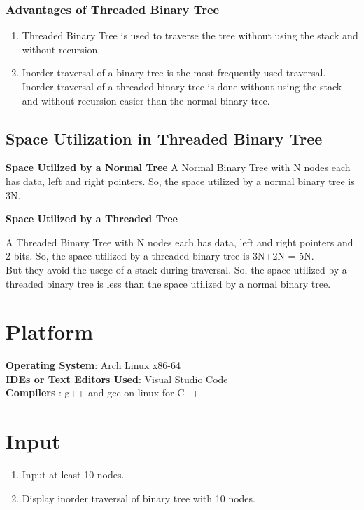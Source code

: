 \documentclass[11pt]{article}
\begin{document}
\subsubsection{Advantages of Threaded Binary Tree}

\begin{enumerate}
    \item Threaded Binary Tree is used to traverse the tree without using the stack and without recursion.
    \item Inorder traversal of a binary tree is the most frequently used traversal. Inorder traversal of a threaded binary tree is done without using the stack and without recursion easier than the normal binary tree.
\end{enumerate}


\subsection{Space Utilization in Threaded Binary Tree}

\textbf{Space Utilized by a Normal Tree}
A Normal Binary Tree with N nodes each has data, left and right pointers. So, the space utilized by a normal binary tree is 3N.\

\textbf{Space Utilized by a Threaded Tree}

A Threaded Binary Tree with N nodes each has data, left and right pointers and 2 bits. So, the space utilized by a threaded binary tree is 3N+2N = 5N.\\

But they avoid the usege of a stack during traversal. So, the space utilized by a threaded binary tree is less than the space utilized by a normal binary tree.

\section{Platform}
\textbf{\textbf{Operating System}}: Arch Linux x86-64 \\
\textbf{\textbf{IDEs or Text Editors Used}}: Visual Studio Code\\
\textbf{\textbf{Compilers} }: g++ and gcc on linux for C++\\

\section{Input}
\begin{enumerate}
    \item Input at least 10 nodes.
    \item Display inorder traversal of binary tree with 10 nodes.
\end{enumerate}
\end{document}
